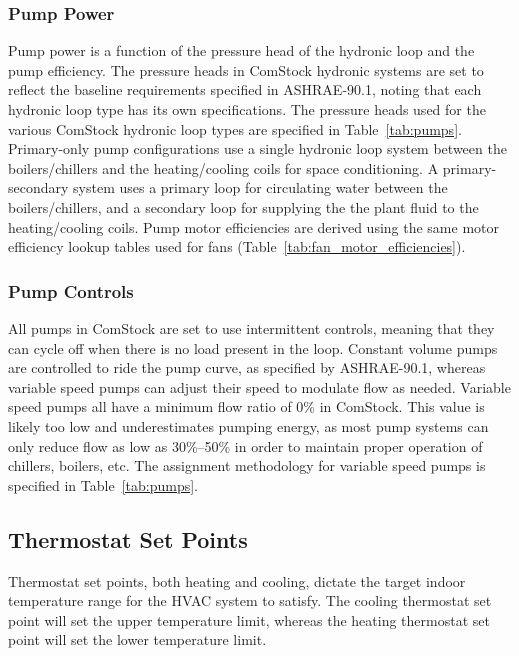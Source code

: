 \subsubsection{Pump Power}

Pump power is a function of the pressure head of the hydronic loop and the pump efficiency. The pressure heads in ComStock hydronic systems are set to reflect the baseline requirements specified in ASHRAE-90.1, noting that each hydronic loop type has its own specifications. The pressure heads used for the various ComStock hydronic loop types are specified in Table~\ref{tab:pumps}. Primary-only pump configurations use a single hydronic loop system between the boilers/chillers and the heating/cooling coils for space conditioning. A primary-secondary system uses a primary loop for circulating water between the boilers/chillers, and a secondary loop for supplying the the plant fluid to the heating/cooling coils. Pump motor efficiencies are derived using the same motor efficiency lookup tables used for fans (Table~\ref{tab:fan_motor_efficiencies}).

\subsubsection{Pump Controls}

All pumps in ComStock are set to use intermittent controls, meaning that they can cycle off when there is no load present in the loop. Constant volume pumps are controlled to ride the pump curve, as specified by ASHRAE-90.1, whereas variable speed pumps can adjust their speed to modulate flow as needed. Variable speed pumps all have a minimum flow ratio of 0\% in ComStock. This value is likely too low and underestimates pumping energy, as most pump systems can only reduce flow as low as 30\%--50\% in order to maintain proper operation of chillers, boilers, etc. The assignment methodology for variable speed pumps is specified in Table~\ref{tab:pumps}.




\subsection{Thermostat Set Points} \label{section:therm_setpoints}
Thermostat set points, both heating and cooling, dictate the target indoor temperature range for the HVAC system to satisfy. The cooling thermostat set point will set the upper temperature limit, whereas the heating thermostat set point will set the lower temperature limit.

